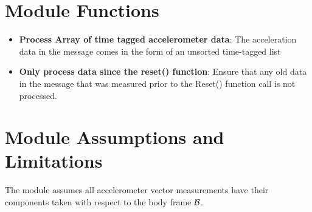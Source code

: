 

\section{Module Functions}
\begin{itemize}
	\item \textbf{Process Array of time tagged accelerometer data}: The acceleration data in the message comes in the form of an unsorted time-tagged list
	\item \textbf{Only process data since the reset() function}: Ensure that any old data in the message that was measured prior to the Reset() function call is not processed.
\end{itemize}

\section{Module Assumptions and Limitations}
The module assumes all accelerometer vector measurements have their components taken with respect to the body frame $\cal B$.  